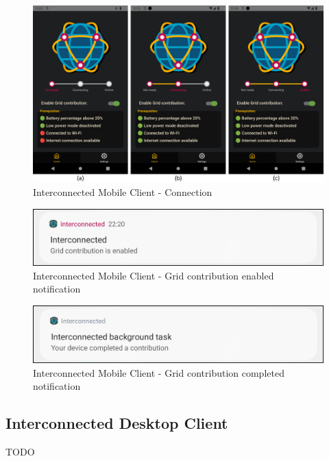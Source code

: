 \begin{figure}[!ht]
    \centering
    \includegraphics[width=\linewidth]{document/chapters/chapter_7/images/interconnected_mobile_connection.png}
    \caption{Interconnected Mobile Client - Connection}
    \label{fig:interconnected_mobile_connection}
\end{figure}

\begin{figure}[!ht]
    \centering
    \includegraphics[scale=0.3]{document/chapters/chapter_7/images/notification_contribution.png}
    \caption{Interconnected Mobile Client - Grid contribution enabled notification}
    \label{fig:notification_contribution}
\end{figure}

\begin{figure}[!ht]
    \centering
    \includegraphics[scale=0.3]{document/chapters/chapter_7/images/notification_completed.png}
    \caption{Interconnected Mobile Client - Grid contribution completed notification}
    \label{fig:notification_completed}
\end{figure}

\subsection{Interconnected Desktop Client}
TODO

